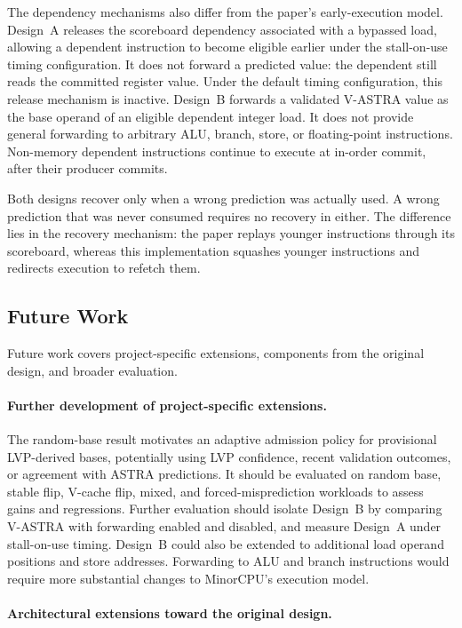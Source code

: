 The dependency mechanisms also differ from the paper's early-execution
model. Design~A releases the scoreboard dependency associated with a
bypassed load, allowing a dependent instruction to become eligible
earlier under the stall-on-use timing configuration. It does not
forward a predicted value: the dependent still reads the committed
register value. Under the default timing configuration, this release
mechanism is inactive. Design~B forwards a validated V-ASTRA value as
the base operand of an eligible dependent integer load. It does not
provide general forwarding to arbitrary ALU, branch, store, or
floating-point instructions. Non-memory dependent instructions
continue to execute at in-order commit, after their producer commits.

Both designs recover
only when a wrong prediction was actually used. A wrong prediction that
was never consumed requires no recovery in either. The difference lies
in the recovery mechanism: the paper replays younger instructions
through its scoreboard, whereas this implementation squashes younger
instructions and redirects execution to refetch them.

\subsection{Future Work}

Future work covers project-specific extensions, components from the
original design, and broader evaluation.

\paragraph{Further development of project-specific extensions.}
The random-base result motivates an adaptive admission policy for
provisional LVP-derived bases, potentially using LVP confidence,
recent validation outcomes, or agreement with ASTRA predictions.
It should be evaluated on random base, stable flip, V-cache flip, mixed,
and forced-misprediction workloads to assess gains and regressions.
Further evaluation should isolate Design~B by comparing V-ASTRA
with forwarding enabled and disabled, and measure Design~A under
stall-on-use timing. Design~B could also be extended to additional
load operand positions and store addresses. Forwarding to ALU and
branch instructions would require more substantial changes to
MinorCPU's execution model.

\paragraph{Architectural extensions toward the original design.}

